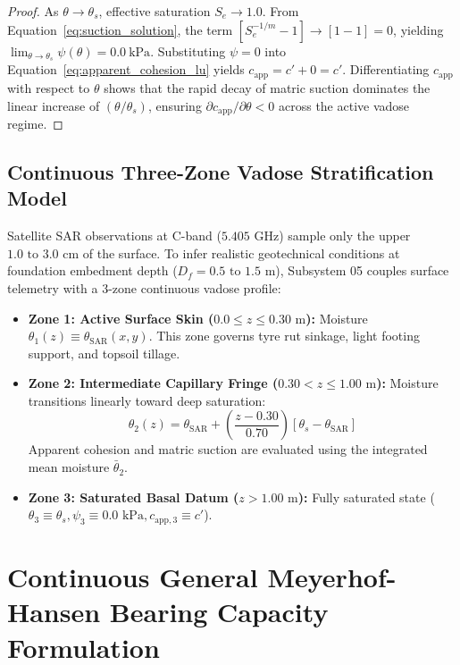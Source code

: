 \documentclass[11pt,a4paper]{article}
\theoremstyle{definition}
\theoremstyle{remark}
\begin{document}
\begin{proof}
    As $\theta \to \theta_s$, effective saturation $S_e \to 1.0$. From Equation~\eqref{eq:suction_solution}, the term $[S_e^{-1/m} - 1] \to [1 - 1] = 0$, yielding $\lim_{\theta \to \theta_s} \psi(\theta) = 0.0~\text{kPa}$. Substituting $\psi = 0$ into Equation~\eqref{eq:apparent_cohesion_lu} yields $c_{\text{app}} = c' + 0 = c'$. Differentiating $c_{\text{app}}$ with respect to $\theta$ shows that the rapid decay of matric suction dominates the linear increase of $(\theta/\theta_s)$, ensuring $\partial c_{\text{app}}/\partial \theta < 0$ across the active vadose regime.
\end{proof}

\subsection{Continuous Three-Zone Vadose Stratification Model}
Satellite SAR observations at C-band ($5.405\text{ GHz}$) sample only the upper $1.0\text{ to }3.0\text{ cm}$ of the surface. To infer realistic geotechnical conditions at foundation embedment depth ($D_f = 0.5\text{ to }1.5\text{ m}$), Subsystem 05 couples surface telemetry with a 3-zone continuous vadose profile:
\begin{itemize}
    \item \textbf{Zone 1: Active Surface Skin ($0.0 \le z \le 0.30\text{ m}$):} Moisture $\theta_1(z) \equiv \theta_{\text{SAR}}(x, y)$. This zone governs tyre rut sinkage, light footing support, and topsoil tillage.
    \item \textbf{Zone 2: Intermediate Capillary Fringe ($0.30 < z \le 1.00\text{ m}$):} Moisture transitions linearly toward deep saturation:
    \begin{equation}
        \theta_2(z) = \theta_{\text{SAR}} + \left( \frac{z - 0.30}{0.70} \right) \left[ \theta_s - \theta_{\text{SAR}} \right]
    \end{equation}
    Apparent cohesion and matric suction are evaluated using the integrated mean moisture $\bar{\theta}_2$.
    \item \textbf{Zone 3: Saturated Basal Datum ($z > 1.00\text{ m}$):} Fully saturated state ($\theta_3 \equiv \theta_s, \psi_3 \equiv 0.0\text{ kPa}, c_{\text{app}, 3} \equiv c'$).
\end{itemize}


\section{Continuous General Meyerhof-Hansen Bearing Capacity Formulation}
\end{document}
